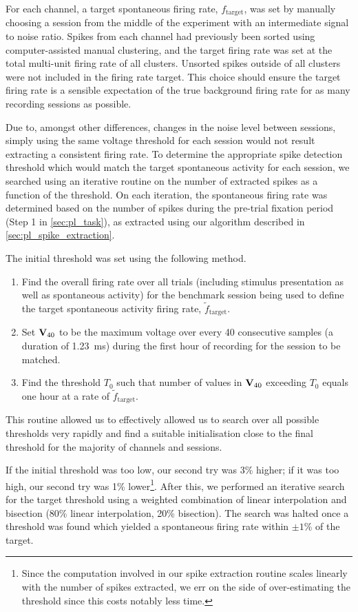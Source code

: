 For each channel, a target spontaneous firing rate, $f_\text{target}$, was set by manually choosing a session from the middle of the experiment with an intermediate signal to noise ratio.
Spikes from each channel had previously been sorted using computer-assisted manual clustering, and the target firing rate was set at the total multi-unit firing rate of all clusters.
Unsorted spikes outside of all clusters were not included in the firing rate target.
This choice should ensure the target firing rate is a sensible expectation of the true background firing rate for as many recording sessions as possible.

Due to, amongst other differences, changes in the noise level between sessions, simply using the same voltage threshold for each session would not result extracting a consistent firing rate.
To determine the appropriate spike detection threshold which would match the target spontaneous activity for each session, we searched using an iterative routine on the number of extracted spikes as a function of the threshold.
On each iteration, the spontaneous firing rate was determined based on the number of spikes during the pre-trial fixation period (Step 1 in \autoref{sec:pl_task}), as extracted using our algorithm described in \autoref{sec:pl_spike_extraction}.

The initial threshold was set using the following method.
\begin{enumerate}
\item Find the overall firing rate over all trials (including stimulus presentation as well as spontaneous activity) for the benchmark session being used to define the target spontaneous activity firing rate, $\tilde{f}_\text{target}$.
\item Set $\mathbf{V}_{40}$ to be the maximum voltage over every 40 consecutive samples (a duration of \SI{1.23}{\milli\second}) during the first hour of recording for the session to be matched.
\item Find the threshold $T_0$ such that number of values in $\mathbf{V}_{40}$ exceeding $T_0$ equals one hour at a rate of $\tilde{f}_\text{target}$.
\end{enumerate}
This routine allowed us to effectively allowed us to search over all possible thresholds very rapidly and find a suitable initialisation close to the final threshold for the majority of channels and sessions.

If the initial threshold was too low, our second try was 3\% higher; if it was too high, our second try was 1\% lower\footnote{Since the computation involved in our spike extraction routine scales linearly with the number of spikes extracted, we err on the side of over-estimating the threshold since this costs notably less time.}.
After this, we performed an iterative search for the target threshold using a weighted combination of linear interpolation and bisection (80\% linear interpolation, 20\% bisection).
The search was halted once a threshold was found which yielded a spontaneous firing rate within $\pm1\%$ of the target.

